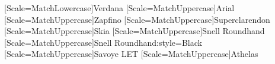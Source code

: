 
\newfontfamily{\lc}[Scale=MatchLowercase]{Verdana}
\newfontfamily{\uc}[Scale=MatchUppercase]{Arial}
\newfontfamily{\zapfino}[Scale=MatchUppercase]{Zapfino}
\newfontfamily{\superclarendon}[Scale=MatchUppercase]{Superclarendon}
\newfontfamily{\skia}[Scale=MatchUppercase]{Skia}
\newfontfamily{\snellRoundhand}[Scale=MatchUppercase]{Snell Roundhand}
\newfontfamily{\snellRoundhandBlack}[Scale=MatchUppercase]{Snell Roundhand:style=Black}
\newfontfamily{\savoyeLET}[Scale=MatchUppercase]{Savoye LET}
\newfontfamily{\athelas}[Scale=MatchUppercase]{Athelas}
